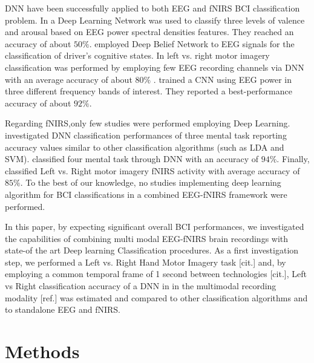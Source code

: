 \documentclass[12pt ]{iopart}
\begin{document}
DNN have been successfully applied to  both EEG and fNIRS BCI classification problem. In \textcite{jirayucharoensak2014eeg} a Deep Learning Network was used to classify three levels of valence and arousal based on EEG power spectral densities  features. They reached an accuracy of about $50\%$. 
\textcite{hajinoroozi2015feature} employed Deep Belief Network to EEG signals for the classification of driver's cognitive states. 
In \textcite{an2014deep} left vs. right motor imagery classification  was performed by employing few EEG recording channels via DNN with an average accuracy of about $80\%$ . 
 \textcite{bashivan2015learning} trained a CNN using EEG power in three different frequency bands of interest. They reported a best-performance accuracy of about $92\%$.

Regarding fNIRS,only  few  studies were performed employing Deep Learning.  \textcite{hennrich2015investigating} investigated DNN classification performances of three mental task reporting accuracy values similar  to other classification algorithms (such as LDA and SVM).  \textcite{abibullaev2011neural} classified four mental task through DNN with an accuracy of $94\%$. Finally, \textcite{nguyen2013temporal} classified Left vs. Right motor imagery fNIRS activity with average accuracy of $85\%$. To the best of our knowledge, no studies implementing deep learning algorithm for BCI classifications  in a combined EEG-fNIRS framework were performed.

 In this paper, by expecting significant overall BCI performances,  we investigated the capabilities of combining multi modal EEG-fNIRS brain recordings  with state-of the art Deep learning Classification procedures. As a first investigation step, we performed a Left vs. Right Hand Motor Imagery task [cit.] and, by employing a common temporal frame of 1 second between technologies [cit.], Left vs Right classification accuracy of a DNN in in the multimodal recording modality  [ref.] was estimated and compared to other classification algorithms and to standalone EEG and fNIRS. 


\section{Methods}
\end{document}
